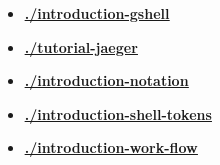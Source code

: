 \documentclass[12pt]{article}
\begin{document}
\begin{itemize}
\item \href{.././introduction-gshell/./introduction-gshell.pdf}{\bf \underline{./introduction-gshell}}

\item \href{.././tutorial-jaeger/./tutorial-jaeger.pdf}{\bf \underline{./tutorial-jaeger}}

\item \href{.././introduction-notation/./introduction-notation.pdf}{\bf \underline{./introduction-notation}}

\item \href{.././introduction-shell-tokens/./introduction-shell-tokens.pdf}{\bf \underline{./introduction-shell-tokens}}

\item \href{.././introduction-work-flow/./introduction-work-flow.pdf}{\bf \underline{./introduction-work-flow}}


\end{itemize}

\end{document}

